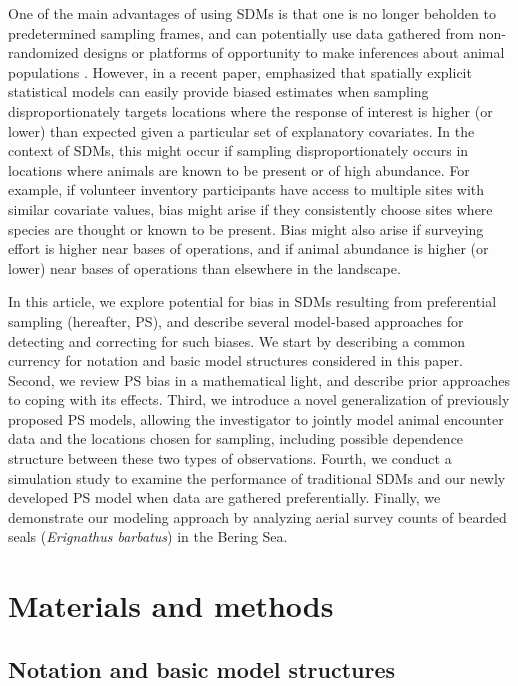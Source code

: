 \documentclass[times,mee,doublespace,]{besauth2}
\begin{document}
One of the main advantages of using SDMs is that one is no longer beholden to predetermined sampling frames, and can potentially use data gathered from non-randomized designs or platforms of opportunity to make inferences about animal populations \citep{JohnsonEtAl2010}.  However,
in a recent paper, \citet{DiggleEtAl2010} emphasized that spatially explicit statistical models can easily provide biased estimates when sampling disproportionately targets locations where the response of interest is higher (or lower) than expected given a particular set of explanatory covariates.  In the context of SDMs, this might occur if sampling disproportionately occurs in locations where animals are known to be present or of high abundance. For example, if volunteer inventory participants have access to multiple sites with similar covariate values, bias might arise if they consistently choose sites where species are thought or known to be present.  Bias might also arise if surveying effort is higher near bases of operations, and if animal abundance is higher (or lower) near bases of operations than elsewhere in the landscape.


In this article, we explore potential for bias in SDMs resulting from preferential sampling (hereafter, PS), and describe several model-based approaches for detecting and correcting for such biases.  We start by describing a common currency for notation and basic model structures considered in this paper.  Second, we review PS bias in a mathematical light, and describe prior approaches to coping with its effects. Third, we introduce a novel generalization of previously proposed PS models, allowing the investigator to jointly model animal encounter data and the locations chosen for sampling, including possible dependence structure between these two types of observations.  Fourth, we conduct a simulation study to examine the performance of traditional SDMs and our newly developed PS model when data are gathered preferentially.  Finally, we demonstrate our modeling approach by analyzing aerial survey counts of bearded seals (\textit{Erignathus barbatus}) in the Bering Sea.


\section{Materials and methods}


\subsection{Notation and basic model structures}
\end{document}
